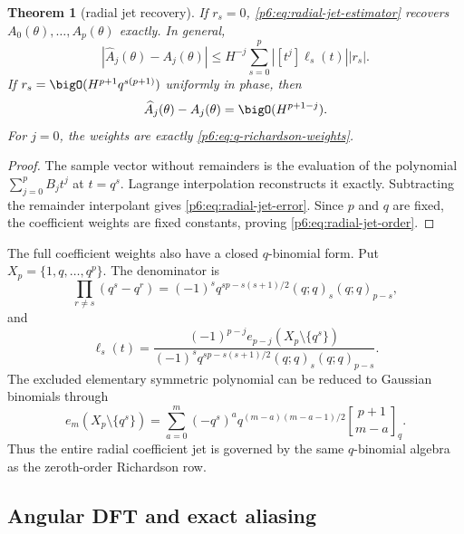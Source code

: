 \documentclass[11pt]{article}
\numberwithin{equation}{section}
\newtheorem{theorem}{Theorem}[section]
\theoremstyle{definition}
\theoremstyle{remark}
\newcommand{\qbinom}[3]{\genfrac{[}{]}{0pt}{}{#1}{#2}_{#3}}
\begin{document}
\begin{theorem}[radial jet recovery]
\label{p6:thm:radial-jet}
If $r_s=0$, \eqref{p6:eq:radial-jet-estimator} recovers
$A_0(\theta),\ldots,A_p(\theta)$ exactly.  In general,
\begin{equation}
 |\widehat A_j(\theta)-A_j(\theta)|
 \le H^{-j}\sum_{s=0}^{p}
 \left|[t^j]\ell_s(t)\right||r_s|.
 \label{p6:eq:radial-jet-error}
\end{equation}
If $r_s=\bigO(H^{p+1}q^{s(p+1)})$ uniformly in phase, then
\begin{equation}
 \widehat A_j(\theta)-A_j(\theta)=\bigO(H^{p+1-j}).
 \label{p6:eq:radial-jet-order}
\end{equation}
For $j=0$, the weights are exactly \eqref{p6:eq:q-richardson-weights}.
\end{theorem}

\begin{proof}
The sample vector without remainders is the evaluation of the polynomial
$\sum_{j=0}^{p}B_jt^j$ at $t=q^s$.  Lagrange interpolation reconstructs it exactly.
Subtracting the remainder interpolant gives \eqref{p6:eq:radial-jet-error}.  Since $p$ and
$q$ are fixed, the coefficient weights are fixed constants, proving
\eqref{p6:eq:radial-jet-order}.
\end{proof}

The full coefficient weights also have a closed $q$-binomial form.  Put
$X_p=\{1,q,\ldots,q^p\}$.  The denominator is
\begin{equation}
 \prod_{r\ne s}(q^s-q^r)
 =(-1)^sq^{sp-s(s+1)/2}(q;q)_s(q;q)_{p-s},
 \label{p6:eq:lagrange-denominator}
\end{equation}
and
\begin{equation}
 [t^j]\ell_s(t)
 =\frac{(-1)^{p-j}e_{p-j}(X_p\setminus\{q^s\})}
 {(-1)^sq^{sp-s(s+1)/2}(q;q)_s(q;q)_{p-s}}.
 \label{p6:eq:jet-q-weights}
\end{equation}
The excluded elementary symmetric polynomial can be reduced to Gaussian binomials through
\begin{equation}
 e_m(X_p\setminus\{q^s\})
 =\sum_{a=0}^{m}(-q^s)^a
 q^{(m-a)(m-a-1)/2}\qbinom{p+1}{m-a}{q}.
 \label{p6:eq:excluded-e-qbinom}
\end{equation}
Thus the entire radial coefficient jet is governed by the same $q$-binomial algebra as the
zeroth-order Richardson row.

\subsection{Angular DFT and exact aliasing}
\end{document}

